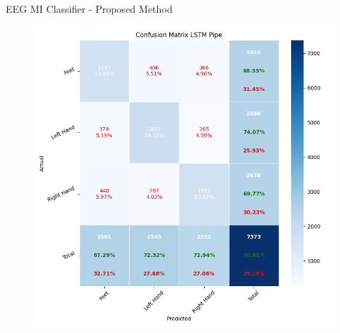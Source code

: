 \begin{frame}{EEG MI Classifier - Proposed Method}
\begin{minipage}[c]{.33\textwidth}
\begin{figure}[htpb!]
            \includegraphics[width=\textwidth]{figures/classification/confusion_matrix_lstm_pipe}
        \end{figure}
    \end{minipage}
\end{frame}

